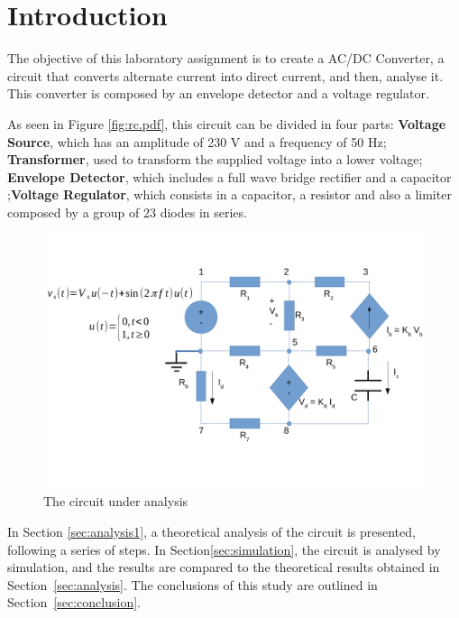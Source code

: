 \section{Introduction}
\label{sec:introduction}

The objective of this laboratory assignment is to create a AC/DC Converter, a circuit that converts alternate current into direct current, and then, analyse it. This converter is composed by an envelope detector and a voltage regulator.

As seen in Figure \ref{fig:rc.pdf}, this circuit can be divided in four parts: \textbf{Voltage Source}, which has an amplitude of 230 V and a frequency of 50 Hz; \textbf{Transformer}, used to transform the supplied voltage into a lower voltage; \textbf{Envelope Detector}, which includes a full wave bridge rectifier and a capacitor ;\textbf{Voltage Regulator}, which consists in a capacitor, a resistor and also a limiter composed by a group of 23 diodes in series.

\begin{figure}[h] \centering
\includegraphics[width=0.99\linewidth]{rc.pdf}
\vspace{-5mm}
\caption{The circuit under analysis}
\label{fig:rc}
\end{figure}

In Section \ref{sec:analysis1}, a theoretical analysis of the circuit is
presented, following a series of steps. In Section\ref{sec:simulation}, the circuit is analysed by
simulation, and the results are compared to the theoretical results obtained in
Section~\ref{sec:analysis}. The conclusions of this study are outlined in
Section~\ref{sec:conclusion}.





